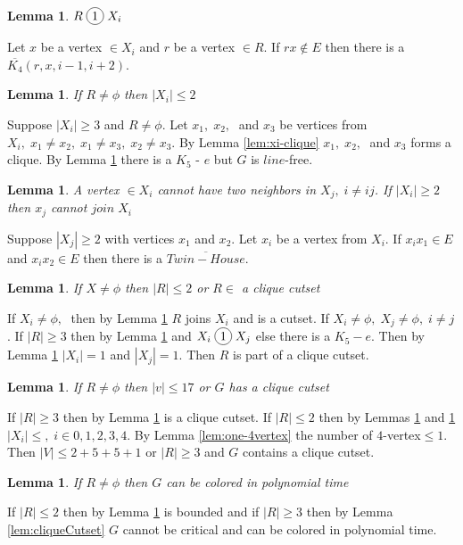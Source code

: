 \documentclass[12pt]{article}
\newcommand*\circled[1]{\tikz[baseline=(char.base)]{
            \node[shape=circle,draw,inner sep=2pt] (char) {#1};}}
\newtheorem{Lemma}[Theorem]{Lemma}
\begin{document}
\begin{Lemma}\label{lem:r-join-xi}
$R \; \circled{1} \; X_i$
\end{Lemma}
 Let $x$ be a vertex $\in X_i$ and $r$ be a vertex $\in R$. If $rx \not \in E$ then there is a $\overline{K_4} (r, x, i-1, i+2)$.

\begin{Lemma}\label{lem:r-limits-xi}
If $R \neq \phi$ then $|X_i| \leq 2$
\end{Lemma}
 Suppose $|X_i| \geq 3$ and $R \neq \phi$. Let $x_1,\; x_2,\;$ and $x_3$ be vertices from $X_i,\; x_1 \neq x_2,\; x_1 \neq x_3,\; x_2 \neq x_3$. By Lemma \ref{lem:xi-clique} $x_1,\; x_2,\;$ and $x_3$ forms a clique. By Lemma \ref{lem:r-join-xi} there is a $K_5$ - $e$ but $G$ is $line$-free.

\begin{Lemma}\label{lem:2xi-cojoins-xj}
A vertex $\in X_i$ cannot have two neighbors in $X_j,\; i \neq ij$.
If $|X_i| \geq 2$ then $x_j$ cannot $ join \; X_i$
\end{Lemma}
 Suppose $|X_j| \geq 2$ with vertices $x_1$ and $x_2$. Let $x_i$ be a vertex from $X_{i}$. If $x_ix_1 \in E$ and $x_ix_2 \in E$ then there is a $\overline{Twin-House}$.

\begin{Lemma}\label{lem:xi-limits-r}
If $X \neq \phi$ then $|R| \leq 2$ or $R \in$ a clique cutset 
\end{Lemma}
 If $X_i \neq \phi,\;$ then by Lemma \ref{lem:r-join-xi} $R$ joins $X_i$ and is a cutset. If $X_i \neq \phi,\; X_j \neq \phi,\; i \neq j$. If $|R| \geq 3$ then by Lemma \ref{lem:r-join-xi} and $X_i \; \circled{1} \; X_j$ else there is a $K_5 - e$. Then by Lemma \ref{lem:2xi-cojoins-xj} $|X_i| = 1$ and $|X_j| = 1$. Then $R$ is part of a clique cutset.

\begin{Lemma}\label{lem:r-bounded}
If $R \neq \phi$ then $ |v| \leq 17$ or $G$ has a clique cutset
\end{Lemma}
 If $|R| \geq 3$ then by Lemma \ref{lem:xi-limits-r} is a clique cutset. If $|R| \leq 2$ then by Lemmas \ref{lem:r-limits-xi} and \ref{lem:2xi-cojoins-xj} $|X_i| \leq,\; i \in {0,1,2,3,4}$. By Lemma \ref{lem:one-4vertex} the number of $4$-vertex$ \leq 1$. Then $|V| \leq 2 + 5 + 5 + 1$ or $|R| \geq 3$ and $G$ contains a clique cutset.

\begin{Lemma}\label{lem:r-polynomial}
If $R \neq \phi$ then $G$ can be colored in polynomial time
\end{Lemma}
 If $|R| \leq 2$ then by Lemma \ref{lem:r-bounded} is bounded and if $|R| \geq 3$ then by Lemma \ref{lem:cliqueCutset} $G$ cannot be critical and can be colored in polynomial time.
\end{document}
